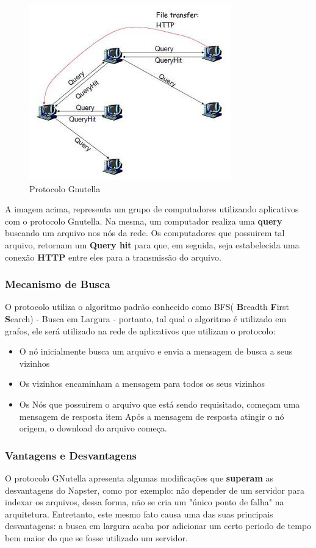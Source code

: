 \documentclass[a4paper]{article}
\begin{document}
\begin{figure}[!h]
\begin{center}
  \includegraphics{img//gnuquery.JPG} 
  \caption{Protocolo Gnutella \cite{examplesofp2p} \label{figure1}}
\end{center}
\end{figure}


A imagem acima, representa um grupo de computadores utilizando aplicativos com o protocolo Gnutella. Na mesma, um computador realiza uma \textbf{query} buscando um arquivo nos nós da rede. Os computadores que possuirem tal arquivo, retornam um \textbf{Query hit} para que, em seguida, seja estabelecida uma conexão \textbf{HTTP} entre eles para a transmissão do arquivo. 



\subsubsection{Mecanismo de Busca}
O protocolo utiliza o algoritmo padrão conhecido como BFS( \textbf{B}readth \textbf{F}irst \textbf{S}earch) - Busca em Largura - portanto, tal qual o algoritmo é utilizado em grafos, ele será utilizado na rede de aplicativos que utilizam o protocolo:\cite{gayatriGN}
\begin{itemize}
	\item O nó inicialmente busca um arquivo e envia a mensagem de busca a seus vizinhos
	\item Os vizinhos encaminham a mensagem para todos os seus vizinhos
	\item Os Nós que possuirem o arquivo que está sendo requisitado, começam uma mensagem de resposta
	item Após a mensagem de resposta atingir o nó origem, o download do arquivo começa.
\end{itemize}
\subsubsection{Vantagens e Desvantagens}
O protocolo GNutella apresenta algumas modificações que \textbf{superam} as desvantagens do Napster, como por exemplo: não depender de um servidor para indexar os arquivos, dessa forma, não se cria um "único ponto de falha" na arquitetura. Entretanto, este mesmo fato causa uma das suas principais desvantagens: a busca em largura acaba por adicionar um certo periodo de tempo bem maior do que se fosse utilizado um servidor.
\end{document}
